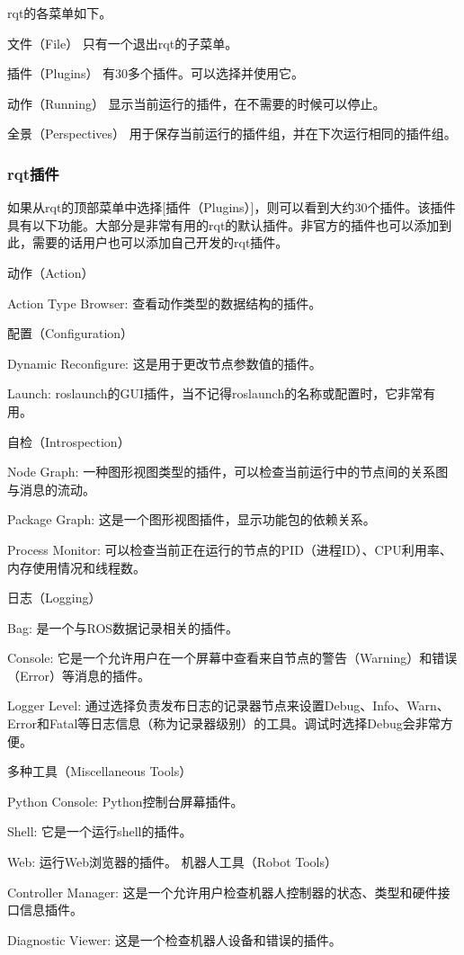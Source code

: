 \documentclass[geye,green,kindle,cn]{elegantnote}
\begin{document}
rqt的各菜单如下。

文件（File）  只有一个退出rqt的子菜单。

插件（Plugins） 有30多个插件。可以选择并使用它。

动作（Running） 显示当前运行的插件，在不需要的时候可以停止。

全景（Perspectives） 用于保存当前运行的插件组，并在下次运行相同的插件组。 
\subsubsection{rqt插件}
如果从rqt的顶部菜单中选择[插件（Plugins）]，则可以看到大约30个插件。该插件具有以下功能。大部分是非常有用的rqt的默认插件。非官方的插件也可以添加到此，需要的话用户也可以添加自己开发的rqt插件。

动作（Action）

Action Type Browser: 查看动作类型的数据结构的插件。 

配置（Configuration）

Dynamic Reconfigure: 这是用于更改节点参数值的插件。

Launch: roslaunch的GUI插件，当不记得roslaunch的名称或配置时，它非常有用。

自检（Introspection）

Node Graph: 一种图形视图类型的插件，可以检查当前运行中的节点间的关系图与消息的流动。

Package Graph: 这是一个图形视图插件，显示功能包的依赖关系。

Process Monitor: 可以检查当前正在运行的节点的PID（进程ID）、CPU利用率、内存使用情况和线程数。

日志（Logging）

Bag: 是一个与ROS数据记录相关的插件。

Console: 它是一个允许用户在一个屏幕中查看来自节点的警告（Warning）和错误（Error）等消息的插件。

Logger Level: 通过选择负责发布日志的记录器节点来设置Debug、Info、Warn、Error和Fatal等日志信息（称为记录器级别）的工具。调试时选择Debug会非常方便。 

多种工具（Miscellaneous Tools）

Python Console: Python控制台屏幕插件。

Shell: 它是一个运行shell的插件。

Web: 运行Web浏览器的插件。 机器人工具（Robot Tools）

Controller Manager: 这是一个允许用户检查机器人控制器的状态、类型和硬件接口信息插件。

Diagnostic Viewer: 这是一个检查机器人设备和错误的插件。
\end{document}
